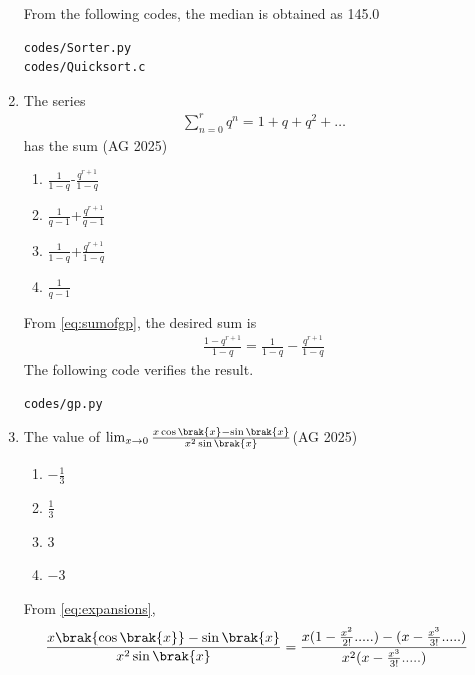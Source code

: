 \begin{enumerate}[label=\thesubsection.\arabic*,ref=\thesubsection.\theenumi]
\begin{enumerate}
    \end{enumerate}   
%
\solution
From the  
following codes, the median is obtained as 
145.0
\begin{lstlisting}
codes/Sorter.py
codes/Quicksort.c
\end{lstlisting}
\item The series 
    \begin{align}
\sum_{n=0}^{r} q^n =1+q+q^2+ \dots
\end{align}
 has the sum \hfill(AG 2025)
	\begin{multicols}{4}
    \begin{enumerate}
    \item $\frac{1}{1-q}$-$\frac{q^{r+1}}{1-q}$
    \item $\frac{1}{q-1}$+$\frac{q^{r+1}}{q-1}$
    \item $\frac{1}{1-q}$+$\frac{q^{r+1}}{1-q}$
    \item $\frac{1}{q-1}$
    \end{enumerate}
\end{multicols}
\solution
	From \eqref{eq:sumofgp},
    the desired sum is
    \begin{align}
        \frac{1-q^{r+1}}{1-q}=
        \frac{1}{1-q}-\frac{q^{r+1}}{1-q}        
    \end{align}
The following code verifies the result.
\begin{lstlisting}
codes/gp.py
\end{lstlisting}
\item The value of $\lim_{x\to 0}\frac{x\cos\brak{x}-\sin\brak{x}}{x^2\sin\brak{x}}$\hfill(AG 2025)
	\begin{multicols}{4}
    \begin{enumerate}
        \item $-\frac{1}{3}$
        \item $\frac{1}{3}$
        \item $3$
        \item$-3$
\end{enumerate}
\end{multicols}
        \solution
        From  \eqref{eq:expansions},
       \begin{align}
        \frac{x\brak{\cos\brak{x}}-\sin\brak{x}}{x^2\sin\brak{x}}
        &=\frac{x(1-\frac{x^2}{2!} .....)-(x-\frac{x^3}{3!}.....)}{x^2(x-\frac{x^3}{3!}.....)}

\end{align}
\end{enumerate}
